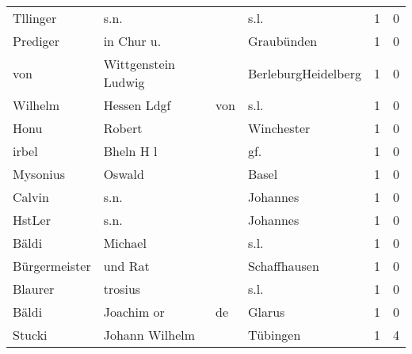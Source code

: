 \begin{center}
\begin{tiny}
\begin{longtabu}{llllrr}
                 Tllinger &                               s.n. &             &                                        s.l. &          1 &         0 \\
                 Prediger &                         in Chur u. &             &                                  Graubünden &          1 &         0 \\
                      von &                Wittgenstein Ludwig &             &                         BerleburgHeidelberg &          1 &         0 \\
                  Wilhelm &                        Hessen Ldgf &         von &                                        s.l. &          1 &         0 \\
                     Honu &                             Robert &             &                                  Winchester &          1 &         0 \\
                    irbel &                          Bheln H l &             &                                        gf.  &          1 &         0 \\
                 Mysonius &                             Oswald &             &                                       Basel &          1 &         0 \\
                   Calvin &                               s.n. &             &                                    Johannes &          1 &         0 \\
                   HstLer &                               s.n. &             &                                    Johannes &          1 &         0 \\
                    Bäldi &                            Michael &             &                                        s.l. &          1 &         0 \\
            Bürgermeister &                            und Rat &             &                                Schaffhausen &          1 &         0 \\
                  Blaurer &                            trosius &             &                                        s.l. &          1 &         0 \\
                    Bäldi &                         Joachim or &          de &                                      Glarus &          1 &         0 \\
                   Stucki &                     Johann Wilhelm &             &                                    Tübingen &          1 &         4 \\

\end{longtabu}
\end{tiny}
\end{center}
